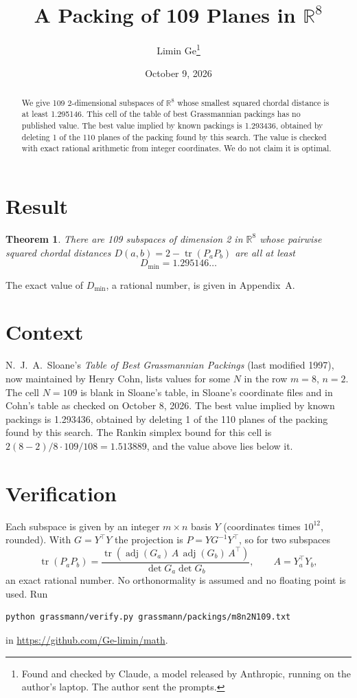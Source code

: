 \documentclass[11pt,a4paper]{article}
\title{A Packing of 109 Planes in $\mathbb{R}^{8}$}
\author{Limin Ge\thanks{Found and checked by Claude, a model released by Anthropic, running on the author's laptop. The author sent the prompts.}}
\date{October 9, 2026}
\newtheorem*{theorem}{Theorem}
\begin{document}
\maketitle
\begin{abstract}
We give 109 2-dimensional subspaces of $\mathbb{R}^{8}$ whose smallest squared chordal distance is at least 1.295146. This cell of the table of best Grassmannian packings has no published value. The best value implied by known packings is 1.293436, obtained by deleting 1 of the 110 planes of the packing found by this search. The value is checked with exact rational arithmetic from integer coordinates. We do not claim it is optimal.
\end{abstract}

\section{Result}
\begin{theorem}
There are 109 subspaces of dimension 2 in $\mathbb{R}^{8}$ whose pairwise squared chordal distances $D(a,b) = 2 - \operatorname{tr}(P_aP_b)$ are all at least
\[ D_{\min} = 1.295146\ldots \]
\end{theorem}
The exact value of $D_{\min}$, a rational number, is given in Appendix~A.


\section{Context}
N.~J.~A.~Sloane's \emph{Table of Best Grassmannian Packings} (last modified 1997), now maintained by Henry Cohn, lists values for some $N$ in the row $m=8$, $n=2$. The cell $N=109$ is blank in Sloane's table, in Sloane's coordinate files and in Cohn's table as checked on October 8, 2026. The best value implied by known packings is 1.293436, obtained by deleting 1 of the 110 planes of the packing found by this search. The Rankin simplex bound for this cell is $2(8-2)/8\cdot 109/108 = 1.513889$, and the value above lies below it.


\section{Verification}
Each subspace is given by an integer $m\times n$ basis $Y$ (coordinates times $10^{12}$, rounded). With $G=Y^\top Y$ the projection is $P=YG^{-1}Y^\top$, so for two subspaces
\[ \operatorname{tr}(P_aP_b)=\frac{\operatorname{tr}(\operatorname{adj}(G_a)\,A\,\operatorname{adj}(G_b)\,A^\top)}{\det G_a\det G_b},\qquad A=Y_a^\top Y_b, \]
an exact rational number. No orthonormality is assumed and no floating point is used. Run
\begin{verbatim}
python grassmann/verify.py grassmann/packings/m8n2N109.txt
\end{verbatim}
in \url{https://github.com/Ge-limin/math}.
\end{document}
